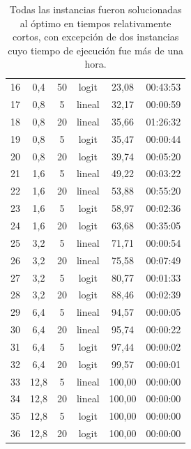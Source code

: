 \documentclass{article}
\begin{document}
\begin{table}
\begin{tabular}{cccccc}
        16 & 0,4 & 50 & logit & 23,08 & 00:43:53 \\
        17 & 0,8 & 5 & lineal & 32,17 & 00:00:59 \\
        18 & 0,8 & 20 & lineal & 35,66 & 01:26:32 \\
        19 & 0,8 & 5 & logit & 35,47 & 00:00:44 \\
        20 & 0,8 & 20 & logit & 39,74 & 00:05:20 \\
        21 & 1,6 & 5 & lineal & 49,22 & 00:03:22 \\
        22 & 1,6 & 20 & lineal & 53,88 & 00:55:20 \\
        23 & 1,6 & 5 & logit & 58,97 & 00:02:36 \\
        24 & 1,6 & 20 & logit & 63,68 & 00:35:05 \\
        25 & 3,2 & 5 & lineal & 71,71 & 00:00:54 \\
        26 & 3,2 & 20 & lineal & 75,58 & 00:07:49 \\
        27 & 3,2 & 5 & logit & 80,77 & 00:01:33 \\
        28 & 3,2 & 20 & logit & 88,46 & 00:02:39 \\
        29 & 6,4 & 5 & lineal & 94,57 & 00:00:05 \\
        30 & 6,4 & 20 & lineal & 95,74 & 00:00:22 \\
        31 & 6,4 & 5 & logit & 97,44 & 00:00:02 \\
        32 & 6,4 & 20 & logit & 99,57 & 00:00:01 \\
        33 & 12,8 & 5 & lineal & 100,00 & 00:00:00 \\
        34 & 12,8 & 20 & lineal & 100,00 & 00:00:00 \\
        35 & 12,8 & 5 & logit & 100,00 & 00:00:00 \\
        36 & 12,8 & 20 & logit & 100,00 & 00:00:00 \\
        \bottomrule
    \end{tabular}
      \caption{Todas las instancias fueron solucionadas al óptimo en tiempos relativamente cortos, con excepción de dos instancias cuyo tiempo de ejecución fue más de una hora.} \label{table:sensibilityresults}
  \end{table}
\end{document}
